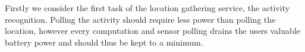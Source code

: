 Firstly we consider the first task of the location gathering service, the activity recognition.
Polling the activity should require less power than polling the location, however every computation and sensor polling drains the users valuable battery power and should thus be kept to a minimum.  




\iffalse
Main
-activate BGS
    BGS (always listening) "RideShareService"
    -register activity
    -if (change to driving): activate LBS *with GPS?
        LBS (listening while driving) "LocationUpdaterService"
        -cacheLocation every x min 
        - utilize isBetterLocation?
        -onDestroy: return cache
    -if (change to other): deactivate LBS + cache -> localDB
-send localDB/routes to astep
\fi